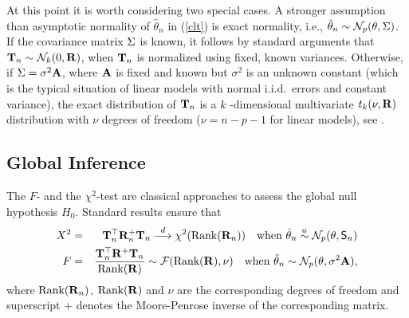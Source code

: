 \documentclass[12pt,a4paper]{article}
\begin{document}
At this point it is worth considering two special cases. A stronger
assumption than asymptotic normality of $\hat{\theta}_n$ in (\ref{clt})
is exact normality, i.e., $\hat{\theta}_n \sim \mathcal{N}_p(\theta, \Sigma)$. 
If the covariance matrix $\Sigma$ is known, 
it follows by standard arguments that $\mathbf{T}_n \sim \mathcal{N}_k(0, \mathbf{R})$, when $\mathbf{T}_n$ is
normalized using fixed, known variances. Otherwise, if
$\Sigma = \sigma^2 \mathbf{A}$, where $\mathbf{A}$ is fixed and known but $\sigma^2$ is an unknown
constant (which is the typical situation of linear models with normal
i.i.d.~errors and constant variance), the exact distribution of $\mathbf{T}_n$ is a $k$%
-dimensional multivariate $t_k(\nu, \mathbf{R})$ distribution with $\nu$ degrees
of freedom ($\nu = n - p - 1$ for linear models), see \citep{Tong1990}.

\subsection{Global Inference}

\label{global} %

The $F$- and the $\chi^2$-test are classical approaches to assess the global
null hypothesis $H_0$. Standard results \citep[such as Theorem
3.5,][]{Serfling1980} ensure that 
\begin{eqnarray*}
X^2 & = & \T_n^\top \Cor_n^+ \T_n
\cL \chi^2(\Rg(\Cor_n)) \quad \text{when } \hat{\theta}_n \an
\N_p(\theta, \Sraw) \\
F & = & \frac{\T_n^\top \Cor^+ \T_n}{\Rg(\Cor)} \sim \F(\Rg(\Cor), \nu) \quad \text{%
when } \hat{\theta}_n \sim \N_p(\theta, \sigma^2 \A),
\end{eqnarray*}
where $\text{Rank}(\mathbf{R}_n)$, $\text{Rank}(\mathbf{R})$ and $\nu$ are the corresponding degrees of freedom
and superscript $+$ denotes the Moore-Penrose inverse of the corresponding
matrix.
\end{document}
